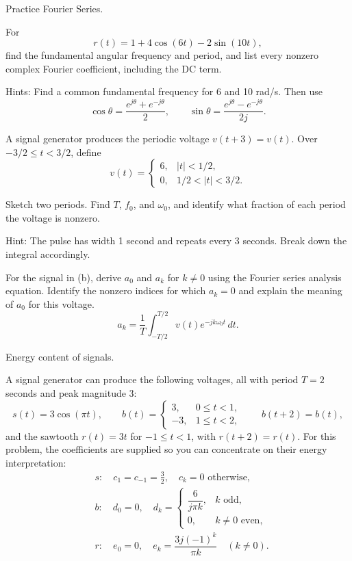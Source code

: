 \documentclass{ee102_pset}
\begin{document}
 Practice Fourier Series.

\problempart[5 points] For
\[
r(t)=1+4\cos(6t)-2\sin(10t),
\]
find the fundamental angular frequency and period, and list every nonzero
complex Fourier coefficient, including the DC term.

Hints: Find a common fundamental frequency for 6 and 10 rad/s. Then use
\[
\cos\theta=\frac{e^{j\theta}+e^{-j\theta}}{2},
\qquad
\sin\theta=\frac{e^{j\theta}-e^{-j\theta}}{2j}.
\]



\problempart[5 points] 
A signal generator produces the periodic voltage $v(t+3)=v(t)$.
Over $-3/2\le t<3/2$, define
\[
v(t)=
\begin{cases}
6,& |t|<1/2,\\
0,& 1/2<|t|<3/2.
\end{cases}
\]

Sketch two periods. Find $T$, $f_0$, and $\omega_0$,
and identify what fraction of each period the voltage is nonzero.

Hint: The pulse has width 1 second and repeats every 3 seconds. Break down the integral accordingly.

\problempart[10 points] For the signal in (b), derive $a_0$ and $a_k$ for $k\ne0$ using the
Fourier series analysis equation. Identify the nonzero indices for which
$a_k=0$ and explain the meaning of $a_0$ for this voltage.
\[
a_k=\frac{1}{T}\int_{-T/2}^{T/2}v(t)e^{-jk\omega_0t}\,dt.
\]

 Energy content of signals.

A signal generator can produce the following voltages, all with period
$T=2$ seconds and peak magnitude 3:
\[
s(t)=3\cos(\pi t),\qquad
b(t)=
\begin{cases}3,&0\le t<1,\\-3,&1\le t<2,\end{cases}
\qquad b(t+2)=b(t),
\]
and the sawtooth $r(t)=3t$ for $-1\le t<1$, with $r(t+2)=r(t)$.
For this problem, the coefficients are supplied so you can concentrate on
their energy interpretation:
\[
\begin{aligned}
&s:\quad c_{1}=c_{-1}=\tfrac32,\quad c_k=0\text{ otherwise},\\
&b:\quad d_0=0,\quad
d_k=\begin{cases}\dfrac{6}{j\pi k},&k\text{ odd},\\[3pt]0,&k\ne0\text{ even},\end{cases}\\
&r:\quad e_0=0,\quad e_k=\dfrac{3j(-1)^k}{\pi k}\quad(k\ne0).
\end{aligned}
\]
\end{document}
